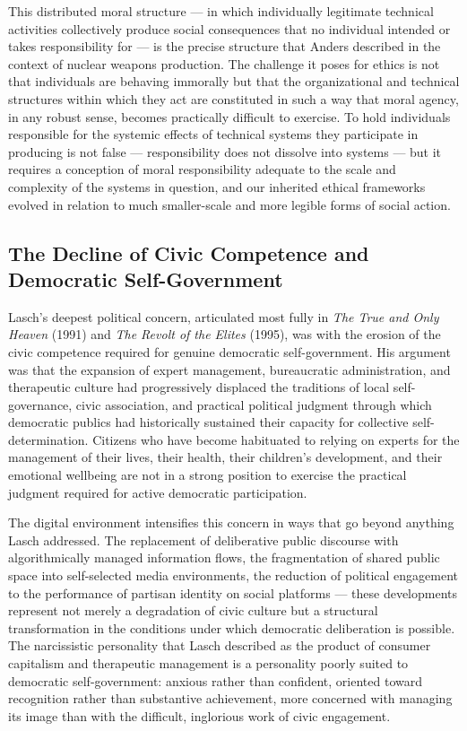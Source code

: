 \documentclass[12pt]{memoir}
\begin{document}
This distributed moral structure — in which individually legitimate technical activities
collectively produce social consequences that no individual intended or takes responsibility
for — is the precise structure that Anders described in the context of nuclear weapons
production. The challenge it poses for ethics is not that individuals are behaving immorally
but that the organizational and technical structures within which they act are constituted in
such a way that moral agency, in any robust sense, becomes practically difficult to exercise.
To hold individuals responsible for the systemic effects of technical systems they participate
in producing is not false — responsibility does not dissolve into systems — but it requires a
conception of moral responsibility adequate to the scale and complexity of the systems in
question, and our inherited ethical frameworks evolved in relation to much smaller-scale and
more legible forms of social action.

\subsection{The Decline of Civic Competence and Democratic Self-Government}

Lasch's deepest political concern, articulated most fully in \textit{The True and Only Heaven}
(1991) and \textit{The Revolt of the Elites} (1995), was with the erosion of the civic
competence required for genuine democratic self-government. His argument was that the expansion
of expert management, bureaucratic administration, and therapeutic culture had progressively
displaced the traditions of local self-governance, civic association, and practical political
judgment through which democratic publics had historically sustained their capacity for
collective self-determination. Citizens who have become habituated to relying on experts for the
management of their lives, their health, their children's development, and their emotional
wellbeing are not in a strong position to exercise the practical judgment required for active
democratic participation.\citep[cf.][]{lasch1995elites}

The digital environment intensifies this concern in ways that go beyond anything Lasch addressed.
The replacement of deliberative public discourse with algorithmically managed information flows,
the fragmentation of shared public space into self-selected media environments, the reduction
of political engagement to the performance of partisan identity on social platforms — these
developments represent not merely a degradation of civic culture but a structural transformation
in the conditions under which democratic deliberation is possible. The narcissistic personality
that Lasch described as the product of consumer capitalism and therapeutic management is a
personality poorly suited to democratic self-government: anxious rather than confident,
oriented toward recognition rather than substantive achievement, more concerned with managing
its image than with the difficult, inglorious work of civic engagement.
\end{document}
